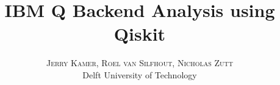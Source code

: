 \documentclass[twoside,twocolumn]{article}
\title{\textbf{IBM Q Backend Analysis using Qiskit}} %
\author{%
\textsc{Jerry Kamer, Roel van Silfhout, Nicholas Zutt}
\\[1ex]
\normalsize{Delft University of Technology}\\ %
}
\date{} %
\begin{document}
	\maketitle














\printbibliography



\appendix


\label{apen} %
\clearpage





\end{document}
